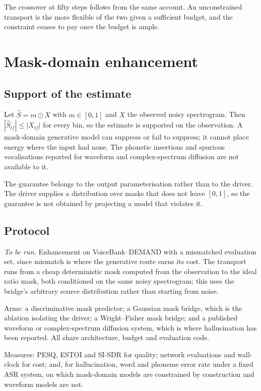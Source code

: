 \documentclass[11pt,a4paper]{article}
\begin{document}
The crossover at fifty steps follows from the same account. An unconstrained
transport is the more flexible of the two given a sufficient budget, and the
constraint ceases to pay once the budget is ample.

\section{Mask-domain enhancement}
\label{sec:exp}

\subsection{Support of the estimate}

Let $\hat S=m\odot X$ with $m\in[0,1]$ and $X$ the observed noisy spectrogram.
Then $|\hat S_{tf}|\le|X_{tf}|$ for every bin, so the estimate is supported on
the observation. A mask-domain generative model can suppress or fail to suppress; it cannot place
energy where the input had none. The phonetic
insertions and spurious vocalisations reported for waveform and complex-spectrum
diffusion \cite{comparison2026,artifree2025} are not available to it.

The guarantee belongs to the output parameterisation rather than to the driver.
The driver supplies a distribution over masks that does not leave $[0,1]$, so
the guarantee is not obtained by projecting a model that violates it.

\subsection{Protocol}

\emph{To be run.} Enhancement on VoiceBank--DEMAND with a mismatched evaluation
set, since mismatch is where the generative route earns its cost. The transport
runs from a cheap deterministic mask computed from the observation to the ideal
ratio mask, both conditioned on the same noisy spectrogram; this uses the
bridge's arbitrary source distribution rather than starting from noise.

Arms: a discriminative mask predictor; a Gaussian mask bridge, which is the
ablation isolating the driver; a Wright--Fisher mask bridge; and a published
waveform or complex-spectrum diffusion system, which is where hallucination has
been reported. All share architecture, budget and evaluation code.

Measures: PESQ, ESTOI and SI-SDR for quality; network evaluations and wall-clock
for cost; and, for hallucination, word and phoneme error rate under a fixed ASR
system, on which mask-domain models are constrained by construction and waveform models
are not.
\end{document}

